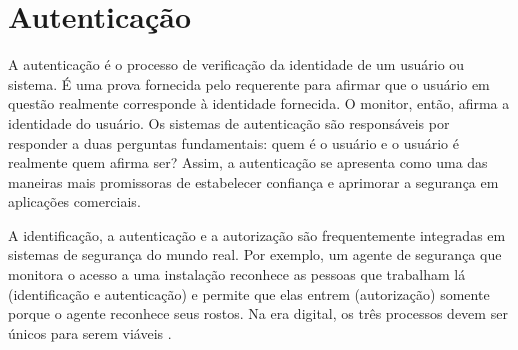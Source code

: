 \section{Autenticação}
\label{sec:autenticacao}


A autenticação é o processo de verificação da identidade de um usuário ou
sistema.
É uma prova fornecida pelo requerente para afirmar que o usuário em questão
realmente corresponde à identidade fornecida.
O monitor, então, afirma a identidade do usuário.
Os sistemas de autenticação são responsáveis por responder a duas perguntas
fundamentais:
quem é o usuário e o usuário é realmente quem afirma ser?
Assim, a autenticação se apresenta como uma das maneiras mais promissoras de
estabelecer confiança e aprimorar a segurança em aplicações comerciais\cite{
    idrus2013}.

A identificação, a autenticação e a autorização são frequentemente integradas em
sistemas de segurança do mundo real.
Por exemplo, um agente de segurança que monitora o acesso a uma instalação
reconhece as pessoas que trabalham lá (identificação e autenticação) e permite
que elas entrem (autorização) somente porque o agente reconhece seus rostos.
Na era digital, os três processos devem ser únicos para serem viáveis
\cite[p.97]{renaud2004}.
